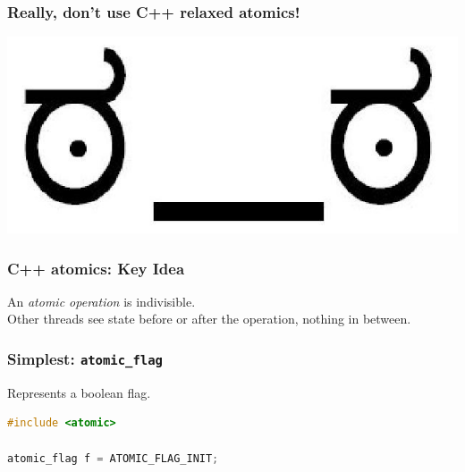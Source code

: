 \begin{frame}[fragile]
  \frametitle{Really, don't use C++ relaxed atomics!}
  \begin{center}
    \includegraphics[width=.8\textwidth]{images/look_of_disapproval}
  \end{center}
\end{frame}

\begin{frame}[fragile]
  \frametitle{C++ atomics: Key Idea}
  
    An \emph{atomic operation} is indivisible.\\[1em]
    Other threads see state before or after the operation,
    nothing in between.
  
\end{frame}

\begin{frame}[fragile]
  \frametitle{Simplest: {\tt atomic\_flag}}
  
    Represents a boolean flag.\\[1em]
    \begin{lstlisting}[language=C]
#include <atomic>

atomic_flag f = ATOMIC_FLAG_INIT;
    \end{lstlisting}
  
\end{frame}

